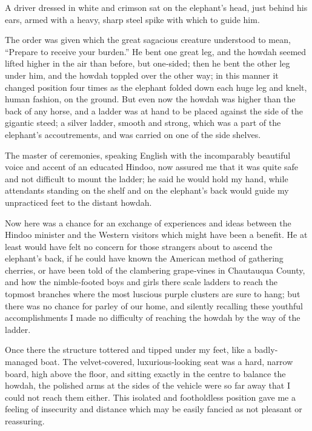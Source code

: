 \documentclass[12pt]{book}
\begin{document}
A driver dressed in white and crimson sat on the elephant’s head, just behind
his ears, armed with a heavy, sharp steel spike with which to guide him.

The order was given which the great sagacious creature understood to mean,
“Prepare to receive your burden.” He bent one great leg, and the howdah seemed
lifted higher in the air than before, but one‐sided; then he bent the other leg
under him, and the howdah toppled over the other way; in this manner it changed
position four times as the elephant folded down each huge leg and knelt, human
fashion, on the ground. But even now the howdah was higher than the back of
any horse, and a ladder was at hand to be placed against the side of the gigantic
steed; a silver ladder, smooth and strong, which was a part of the elephant’s
accoutrements, and was carried on one of the side shelves.

The master of ceremonies, speaking English with the incomparably beautiful
voice and accent of an educated Hindoo, now assured me that it was quite safe and
not difficult to mount the ladder; he said he would hold my hand, while attendants
standing on the shelf and on the elephant’s back would guide my unpracticed
feet to the distant howdah.

Now here was a chance for an exchange of experiences and ideas between the
Hindoo minister and the Western visitors which might have been a benefit. He at
least would have felt no concern for those strangers about to ascend the elephant’s
back, if he could have known the American method of gathering cherries, or have
been told of the clambering grape‐vines in Chautauqua County, and how the
nimble‐footed boys and girls there scale ladders to reach the topmost branches
where the most luscious purple clusters are sure to hang; but there was no chance
for parley of our home, and silently recalling these youthful accomplishments I
made no difficulty of reaching the howdah by the way of the ladder.

Once there the structure tottered and tipped under my feet, like a badly‐managed boat. The velvet‐covered, luxurious‐looking seat was a hard, narrow board,
high above the floor, and sitting exactly in the centre to balance the howdah, the
polished arms at the sides of the vehicle were so far away that I could not reach
them either. This isolated and footholdless position gave me a feeling of insecurity
and distance which may be easily fancied as not pleasant or reassuring.
\end{document}
